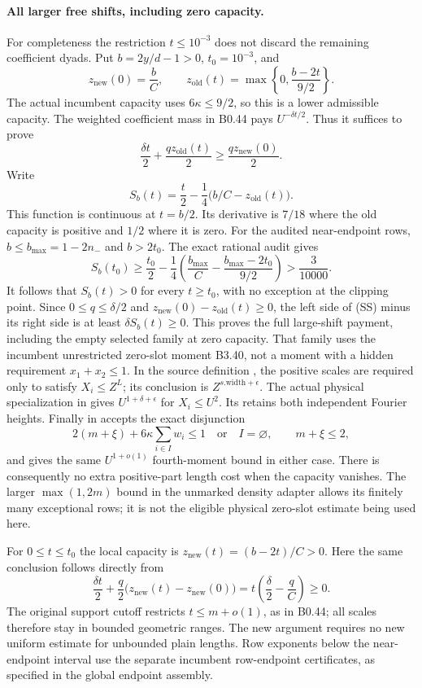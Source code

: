 \paragraph{All larger free shifts, including zero capacity.}
For completeness the restriction $t\le10^{-3}$ does not discard the
remaining coefficient dyads. Put $b=2y/d-1>0$, $t_0=10^{-3}$,
and
\[
 z_{\mathrm{new}}(0)=\frac bC,\qquad
 z_{\mathrm{old}}(t)=\max\left\{0,\frac{b-2t}{9/2}\right\}.
\]
The actual incumbent capacity uses $6\kappa\le9/2$, so this is a
lower admissible capacity. The weighted coefficient mass in B0.44
pays $U^{-\delta t/2}$. Thus it suffices to prove
\[
 \frac{\delta t}{2}+\frac{qz_{\mathrm{old}}(t)}2
 \ge\frac{qz_{\mathrm{new}}(0)}2.
 \tag{SS}
\]
Write
\[
 S_b(t)=\frac t2-\frac14\bigl(b/C-z_{\mathrm{old}}(t)\bigr).
\]
This function is continuous at $t=b/2$. Its derivative is $7/18$
where the old capacity is positive and $1/2$ where it is zero.
For the audited near-endpoint rows,
$b\le b_{\max}=1-2n_-$ and $b>2t_0$.
The exact rational audit gives
\[
 S_b(t_0)\ge
 \frac{t_0}{2}-\frac14
   \left(\frac{b_{\max}}C-
         \frac{b_{\max}-2t_0}{9/2}\right)
 >\frac3{10000}.
\]
It follows that $S_b(t)>0$ for every $t\ge t_0$, with no exception
at the clipping point. Since $0\le q\le\delta/2$ and
$z_{\mathrm{new}}(0)-z_{\mathrm{old}}(t)\ge0$, the left side of
(SS) minus its right side is at least $\delta S_b(t)\ge0$.
This proves the full large-shift payment, including the empty selected
family at zero capacity. That family uses the incumbent unrestricted
zero-slot moment B3.40, not a moment with a hidden requirement
$x_1+x_2\le1$. In the source definition , the
positive scales are required only to satisfy $X_i\le Z^L$; its
conclusion is $Z^{s.\mathrm{width}+\epsilon}$. The actual physical
specialization  in
 gives
$U^{1+\delta+\epsilon}$ for $X_i\le U^2$.
Its 
retains both independent Fourier heights.
Finally  in
 accepts
the exact disjunction
\[
 2(m+\xi)+6\kappa\sum_{i\in I}w_i\le1
 \quad\text{or}\quad I=\varnothing,
 \qquad m+\xi\le2,
\]
and gives the same $U^{1+o(1)}$ fourth-moment bound in either case.
There is consequently no extra positive-part length cost when the
capacity vanishes. The larger $\max(1,2m)$ bound in the unmarked
density adapter allows its finitely many exceptional rows; it is
not the eligible physical zero-slot estimate being used here.

For $0\le t\le t_0$ the local capacity is
$z_{\mathrm{new}}(t)=(b-2t)/C>0$.
Here the same conclusion follows directly from
\[
 \frac{\delta t}{2}+
 \frac q2\bigl(z_{\mathrm{new}}(t)-z_{\mathrm{new}}(0)\bigr)
 =t\left(\frac\delta2-\frac qC\right)\ge0.
\]
The original support cutoff restricts $t\le m+o(1)$, as in B0.44;
all scales therefore stay in bounded geometric ranges. The new
argument requires no new uniform estimate for unbounded plain
lengths. Row exponents below the near-endpoint interval use the
separate incumbent row-endpoint certificates, as specified in the
global endpoint assembly.
